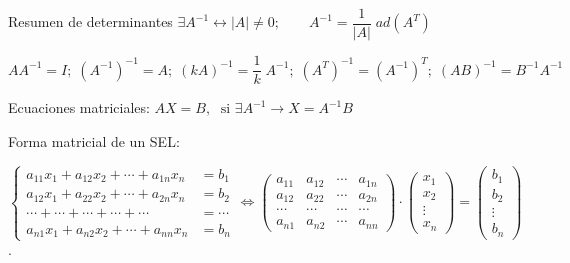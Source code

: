 \begin{myalertblock}{Resumen de determinantes}
 \vspace{2mm} $\exists A^{-1} \leftrightarrow |A|\neq 0 ; \qquad A^{-1}=\dfrac 1 {|A|}\; ad(A^T)$
 
 \tiny{$AA^{-1}=I;\;(A^{-1})^{-1}=A;\; (kA)^{-1}=\dfrac 1 {k}\; A^{-1};  \; (A^T)^{-1}=(A^{-1})^T; \; (AB)^{-1}=B^{-1}A^{-1}$}
 
\vspace{2mm} \normalsize{ Ecuaciones matriciales:} $AX=B, \; \text{ si } \exists A^{-1} \to X=A^{-1}B$

\vspace{2mm} Forma matricial de un SEL:


\vspace{1mm} \tiny{$\boxed{\begin{cases} a_{11}x_1+a_{12}x_2 + \cdots + a_{1n}x_n &=b_1 \\
a_{12}x_1+a_{22}x_2 + \cdots + a_{2n}x_n &=b_2 \\
\cdots + \cdots + \cdots + \cdots + \cdots  &=\cdots \\
a_{n1}x_1+a_{n2}x_2+\cdots +a_{nn}x_n &=b_n  \end{cases}  \Leftrightarrow 
\left( \begin{matrix}  a_{11}&a_{12}& \cdots &a_{1n} \\
a_{12} &a_{22} &\cdots &a_{2n} \\
\cdots & \cdots & \cdots & \cdots  \\
a_{n1} &a_{n2} &\cdots &a_{nn}    \end{matrix} \right) \cdot \left( \begin{matrix} x_1\\x_2\\ \vdots \\x_n \end{matrix} \right)=\left( \begin{matrix} b_1\\b_2\\ \vdots \\b_n \end{matrix} \right)}$}\normalsize{ .}
 
 
 


	
\end{myalertblock}






		




